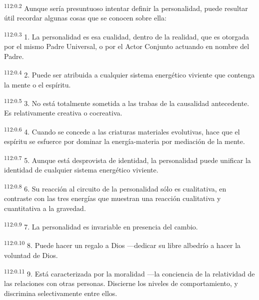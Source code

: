 \documentclass[twoside, 11pt]{book}
\begin{document}
\par
\textsuperscript{112:0.2} Aunque sería presuntuoso intentar definir la personalidad, puede resultar útil recordar algunas cosas que se conocen sobre ella:

\par
\textsuperscript{112:0.3} 1. La personalidad es esa cualidad, dentro de la realidad, que es otorgada por el mismo Padre Universal, o por el Actor Conjunto actuando en nombre del Padre.

\par
\textsuperscript{112:0.4} 2. Puede ser atribuida a cualquier sistema energético viviente que contenga la mente o el espíritu.

\par
\textsuperscript{112:0.5} 3. No está totalmente sometida a las trabas de la causalidad antecedente. Es relativamente creativa o cocreativa.

\par
\textsuperscript{112:0.6} 4. Cuando se concede a las criaturas materiales evolutivas, hace que el espíritu se esfuerce por dominar la energía-materia por mediación de la mente.

\par
\textsuperscript{112:0.7} 5. Aunque está desprovista de identidad, la personalidad puede unificar la identidad de cualquier sistema energético viviente.

\par
\textsuperscript{112:0.8} 6. Su reacción al circuito de la personalidad sólo es cualitativa, en contraste con las tres energías que muestran una reacción cualitativa y cuantitativa a la gravedad.

\par
\textsuperscript{112:0.9} 7. La personalidad es invariable en presencia del cambio.

\par
\textsuperscript{112:0.10} 8. Puede hacer un regalo a Dios ---dedicar su libre albedrío a hacer la voluntad de Dios.

\par
\textsuperscript{112:0.11} 9. Está caracterizada por la moralidad ---la conciencia de la relatividad de las relaciones con otras personas. Discierne los niveles de comportamiento, y discrimina selectivamente entre ellos.
\end{document}
